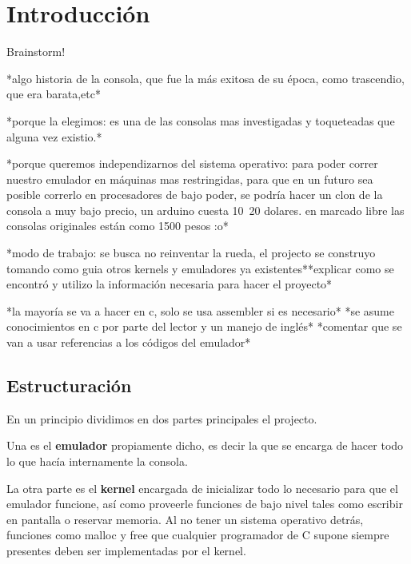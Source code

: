 \chapter{Introducción}

Brainstorm!


*algo historia de la consola, que fue la más exitosa de su época, como trascendio, que era barata,etc*

*porque la elegimos: es una de las consolas mas investigadas y toqueteadas que alguna vez existio.*

*porque queremos independizarnos del sistema operativo: para poder correr nuestro emulador en máquinas mas restringidas, para que en un futuro sea posible correrlo en procesadores de bajo poder, se podría hacer un clon de la consola a muy bajo precio, un arduino cuesta 10~20 dolares. en marcado libre las consolas originales están como 1500 pesos :o*

*modo de trabajo: se busca no reinventar la rueda, el projecto se construyo tomando como guia otros kernels y emuladores ya existentes**explicar como se encontró y utilizo la información necesaria para hacer el proyecto*

*la mayoría se va a hacer en c, solo se usa assembler si es necesario*
*se asume conocimientos en c por parte del lector y un manejo de inglés*
*comentar que se van a usar referencias a los códigos del emulador*

\section{Estructuración}

En un principio dividimos en dos partes principales el projecto.

Una es el \textbf{emulador} propiamente dicho, es decir la que se encarga de hacer todo lo que hacía internamente la consola.

La otra parte es el \textbf{kernel} encargada de inicializar todo lo necesario para que el emulador funcione, así como proveerle funciones de bajo nivel tales como escribir en pantalla o reservar memoria. Al no tener un sistema operativo detrás, funciones como malloc y free que cualquier programador de C supone siempre presentes deben ser implementadas por el kernel.
